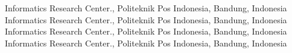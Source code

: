  Informatics Research Center., Politeknik Pos Indonesia, Bandung,
Indonesia
 Informatics Research Center., Politeknik Pos Indonesia, Bandung,
Indonesia
 Informatics Research Center., Politeknik Pos Indonesia, Bandung,
Indonesia
 Informatics Research Center., Politeknik Pos Indonesia, Bandung,
Indonesia